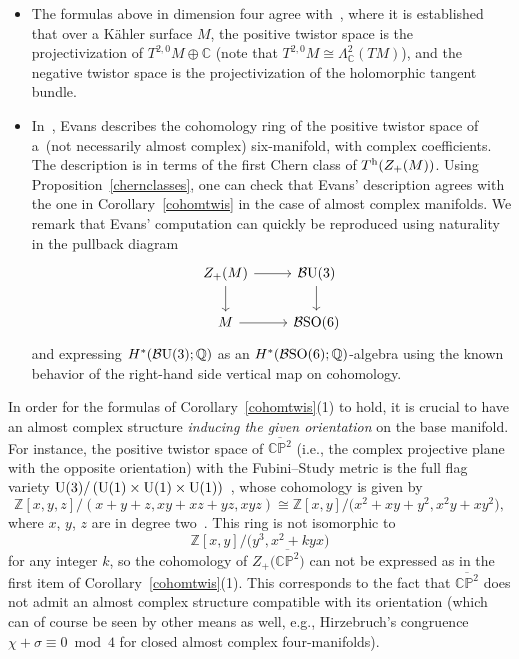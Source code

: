 \documentclass[pdftex]{sigma}%
\newcommand{\CP}{\mathbb{CP}}
\newcommand{\ZZ}{\mathbb{Z}}
\newcommand{\Q}{\mathbb{Q}}
\newcommand{\C}{\mathbb{C}}
\numberwithin{equation}{section}
\begin{document}
\begin{Remark}\quad
 \begin{itemize}\itemsep=0pt \item The formulas above in dimension four agree with~\cite[Theorem~11.2]{ESa85}, where it is established that over a K\"ahler surface $M$, the positive twistor space is the projectivization of $T^{2,0}M \oplus \C$ (note that $T^{2,0}M \cong \Lambda_{\C}^2(TM)$), and the negative twistor space is the projectivization of the holomorphic tangent bundle.

\item In~\cite[Section~6]{Ev14}, Evans describes the cohomology ring of the positive twistor space of a~(not necessarily almost complex) six-manifold, with complex coefficients. The description is in terms of the first Chern class of $T^{\rm h}(Z_+(M))$. Using Proposition~\ref{chernclasses}, one can check that Evans' description agrees with the one in Corollary~\ref{cohomtwis} in the case of almost complex manifolds. We remark that Evans' computation can quickly be reproduced using naturality in the pullback diagram
\[\begin{tikzcd}
Z_+(M) \arrow[d] \arrow[r] & {\mathcal B}{\rm U}(3) \arrow[d] \\
M \arrow[r] & {\mathcal B}{\rm SO}(6)
\end{tikzcd}\]
and expressing $H^*({\mathcal B}{\rm U}(3);\Q)$ as an $H^*({\mathcal B}{\rm SO}(6);\Q)$-algebra using the known behavior of the right-hand side vertical map on cohomology. \end{itemize}
\end{Remark}

\begin{Remark}\label{cp2bar} In order for the formulas of Corollary~\ref{cohomtwis}(1) to hold, it is crucial to have an almost complex structure \emph{inducing the given orientation} on the base manifold. For instance, the positive twistor space of $\overline{\CP^2}$ (i.e., the complex projective plane with the opposite orientation) with the Fubini--Study metric is the full flag variety ${\rm U}(3)/\left( {\rm U}(1)\times {\rm U}(1) \times {\rm U}(1) \right)$~\cite[p.~217, Example~1]{Sa84}, whose cohomology is given by
\[\ZZ[x,y,z]/(x+y+z, xy+xz+yz, xyz) \cong \ZZ[x,y]/\big(x^2+xy+y^2, x^2y+xy^2\big),\]
where $x$, $y$, $z$ are in degree two~\cite[Proposition~31.1]{B53}. This ring is not isomorphic to
\[\ZZ[x,y]/\big(y^3, x^2 + kyx\big)\]
for any integer $k$, so the cohomology of $Z_+\big(\overline{\CP^2}\big)$ can not be expressed as in the first item of Corollary~\ref{cohomtwis}(1). This corresponds to the fact that $\overline{\CP^2}$ does not admit an almost complex structure compatible with its orientation (which can of course be seen by other means as well, e.g., Hirzebruch's congruence $\chi + \sigma \equiv 0 \bmod 4$ for closed almost complex four-manifolds).
\end{Remark}
\end{document}
